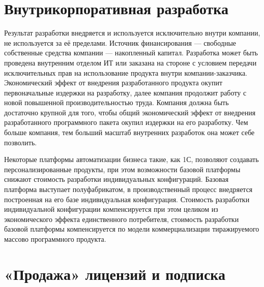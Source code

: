 \documentclass{article}
\begin{document}
\section*{Внутрикорпоративная разработка}

Результат разработки внедряется и используется исключительно внутри компании, не используется за её пределами. Источник финансирования — свободные собственные средства компании — накопленный капитал. Разработка может быть проведена внутренним отделом ИТ или заказана на стороне с условием передачи исключительных прав на использование продукта внутри компании-заказчика. Экономический эффект от внедрения разработанного продукта окупит первоначальные издержки на разработку, далее компания продолжит работу с новой повышенной производительностью труда. Компания должна быть достаточно крупной для того, чтобы общий экономический эффект от внедрения разработанного программного пакета окупил издержки на его разработку. Чем больше компания, тем больший масштаб внутренних разработок она может себе позволить.

Некоторые платформы автоматизации бизнеса такие, как 1С, позволяют создавать персонализированные продукты, при этом возможности базовой платформы снижают стоимость разработки индивидуальных конфигураций. Базовая платформа выступает полуфабрикатом, в производственный процесс внедряется построенная на его базе индивидуальная конфигурация. Стоимость разработки индивидуальной конфигурации компенсируется при этом целиком из экономического эффекта единственного потребителя, стоимость разработки базовой платформы компенсируется по модели коммерциализации тиражируемого массово программного продукта.

\section*{«Продажа» лицензий и подписка}
\end{document}
